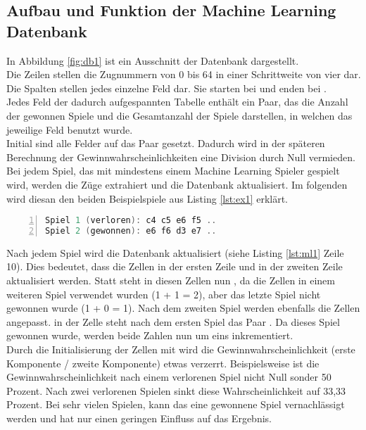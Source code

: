 \subsection{Aufbau und Funktion der Machine Learning Datenbank}
In Abbildung \ref{fig:db1} ist ein Ausschnitt der Datenbank dargestellt.
\\
Die Zeilen stellen die Zugnummern von 0 bis 64 in einer Schrittweite von vier dar. Die Spalten stellen jedes einzelne Feld dar. Sie starten bei  und enden bei .
\\Jedes Feld der dadurch aufgespannten Tabelle enthält ein Paar, das die Anzahl der gewonnen Spiele und die Gesamtanzahl der Spiele darstellen, in welchen das jeweilige Feld benutzt wurde.
\\Initial sind alle Felder auf das Paar  gesetzt. Dadurch wird in der späteren Berechnung der Gewinnwahrscheinlichkeiten eine Division durch Null vermieden.
\\Bei jedem Spiel, das mit mindestens einem Machine Learning Spieler gespielt wird, werden die Züge extrahiert und die Datenbank aktualisiert. Im folgenden wird diesan den beiden Beispielspiele aus Listing \ref{lst:ex1} erklärt.
\newpage
\begin{lstlisting}[caption = {Auschnitte aus Zugfolge zweier Spiele}, language = cpp, captionpos = t , numbers=left, label={lst:ex1}]
Spiel 1 (verloren): c4 c5 e6 f5 ..
Spiel 2 (gewonnen): e6 f6 d3 e7 ..
\end{lstlisting}
Nach jedem Spiel wird die Datenbank aktualisiert (siehe Listing \ref{lst:ml1} Zeile 10). Dies bedeutet, dass die Zellen  in der ersten Zeile und  in der zweiten Zeile aktualisiert werden. Statt  steht in diesen Zellen nun , da die Zellen in einem weiteren Spiel verwendet wurden (1 + 1 = 2), aber das letzte Spiel nicht gewonnen wurde (1 + 0 = 1). Nach dem zweiten Spiel werden ebenfalls die Zellen angepasst. in der Zelle  steht nach dem ersten Spiel das Paar . Da dieses Spiel gewonnen wurde, werden beide Zahlen nun um eins inkrementiert.
\\Durch die Initialisierung der Zellen mit  wird die Gewinnwahrscheinlichkeit (erste Komponente / zweite Komponente) etwas verzerrt. Beispielsweise ist die Gewinnwahrscheinlichkeit nach einem verlorenen Spiel nicht Null sonder 50 Prozent. Nach zwei verlorenen Spielen sinkt diese Wahrscheinlichkeit auf 33,33 Prozent. Bei sehr vielen Spielen, kann das eine gewonnene Spiel vernachlässigt werden und hat nur einen geringen Einfluss auf das Ergebnis.
